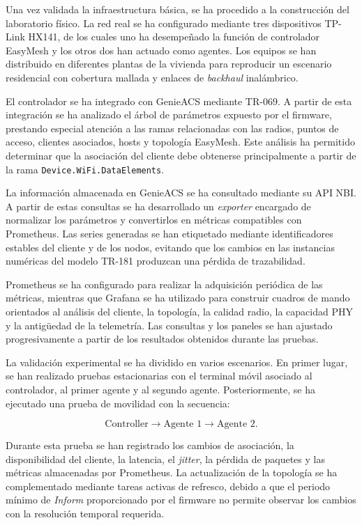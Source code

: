 Una vez validada la infraestructura básica, se ha procedido a la
construcción del laboratorio físico. La red real se ha configurado
mediante tres dispositivos TP-Link HX141, de los cuales uno ha
desempeñado la función de controlador EasyMesh y los otros dos han
actuado como agentes. Los equipos se han distribuido en diferentes
plantas de la vivienda para reproducir un escenario residencial con
cobertura mallada y enlaces de \textit{backhaul} inalámbrico.

El controlador se ha integrado con GenieACS mediante TR-069. A partir de
esta integración se ha analizado el árbol de parámetros expuesto por el
firmware, prestando especial atención a las ramas relacionadas con las
radios, puntos de acceso, clientes asociados, hosts y topología EasyMesh.
Este análisis ha permitido determinar que la asociación del cliente debe
obtenerse principalmente a partir de la rama
\texttt{Device.WiFi.DataElements}.

La información almacenada en GenieACS se ha consultado mediante su API
NBI. A partir de estas consultas se ha desarrollado un \textit{exporter}
encargado de normalizar los parámetros y convertirlos en métricas
compatibles con Prometheus. Las series generadas se han etiquetado
mediante identificadores estables del cliente y de los nodos, evitando
que los cambios en las instancias numéricas del modelo TR-181 produzcan
una pérdida de trazabilidad.

Prometheus se ha configurado para realizar la adquisición periódica de
las métricas, mientras que Grafana se ha utilizado para construir cuadros
de mando orientados al análisis del cliente, la topología, la calidad
radio, la capacidad PHY y la antigüedad de la telemetría. Las consultas y
los paneles se han ajustado progresivamente a partir de los resultados
obtenidos durante las pruebas.

La validación experimental se ha dividido en varios escenarios. En primer
lugar, se han realizado pruebas estacionarias con el terminal móvil
asociado al controlador, al primer agente y al segundo agente.
Posteriormente, se ha ejecutado una prueba de movilidad con la secuencia:

\[
    \text{Controller}
    \longrightarrow
    \text{Agente 1}
    \longrightarrow
    \text{Agente 2}.
\]

Durante esta prueba se han registrado los cambios de asociación, la
disponibilidad del cliente, la latencia, el \textit{jitter}, la pérdida
de paquetes y las métricas almacenadas por Prometheus. La actualización
de la topología se ha complementado mediante tareas activas de refresco,
debido a que el periodo mínimo de \textit{Inform} proporcionado por el
firmware no permite observar los cambios con la resolución temporal
requerida.


